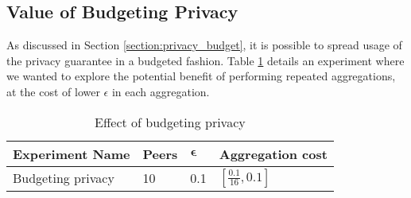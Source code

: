 
\subsection{Value of Budgeting Privacy}
 
As discussed in Section \ref{section:privacy_budget}, it is possible to spread usage of the privacy guarantee in a budgeted fashion. Table \ref{tab:experiments_budgeting_privacy} details an experiment where we wanted to explore the potential benefit of performing repeated aggregations, at the cost of lower $\epsilon$ in each aggregation.

\begin{table}[h]
	\centering	
	\label{tab:experiments_budgeting_privacy}
	\begin{tabular}{|l|l|l|l|}
		{\bf Experiment Name} & {\bf Peers} & $\boldsymbol{\epsilon}$ & {\bf Aggregation cost}        \\
		\hline
		Budgeting privacy & 10    & 0.1     & $[\frac{0.1}{16}, 0.1]$
	\end{tabular}
	\caption{Effect of budgeting privacy}
\end{table}
